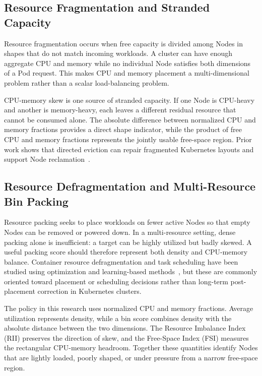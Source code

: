 \subsection{Resource Fragmentation and Stranded Capacity}
\label{sec:resourceFragmentation}

Resource fragmentation occurs when free capacity is divided among Nodes in shapes that do not match incoming workloads. A cluster can have enough aggregate CPU and memory while no individual Node satisfies both dimensions of a Pod request. This makes CPU and memory placement a multi-dimensional problem rather than a scalar load-balancing problem.

CPU-memory skew is one source of stranded capacity. If one Node is CPU-heavy and another is memory-heavy, each leaves a different residual resource that cannot be consumed alone. The absolute difference between normalized CPU and memory fractions provides a direct shape indicator, while the product of free CPU and memory fractions represents the jointly usable free-space region. Prior work shows that directed eviction can repair fragmented Kubernetes layouts and support Node reclamation~\cite{larsson_klein_elmroth_2023}.

\subsection{Resource Defragmentation and Multi-Resource Bin Packing}
\label{sec:binPacking}

Resource packing seeks to place workloads on fewer active Nodes so that empty Nodes can be removed or powered down. In a multi-resource setting, dense packing alone is insufficient: a target can be highly utilized but badly skewed. A useful packing score should therefore represent both density and CPU-memory balance. Container resource defragmentation and task scheduling have been studied using optimization and learning-based methods~\cite{guo2025joint,bagaa2024multiobjective}, but these are commonly oriented toward placement or scheduling decisions rather than long-term post-placement correction in Kubernetes clusters.

The policy in this research uses normalized CPU and memory fractions. Average utilization represents density, while a bin score combines density with the absolute distance between the two dimensions. The Resource Imbalance Index (RII) preserves the direction of skew, and the Free-Space Index (FSI) measures the rectangular CPU-memory headroom. Together these quantities identify Nodes that are lightly loaded, poorly shaped, or under pressure from a narrow free-space region.

